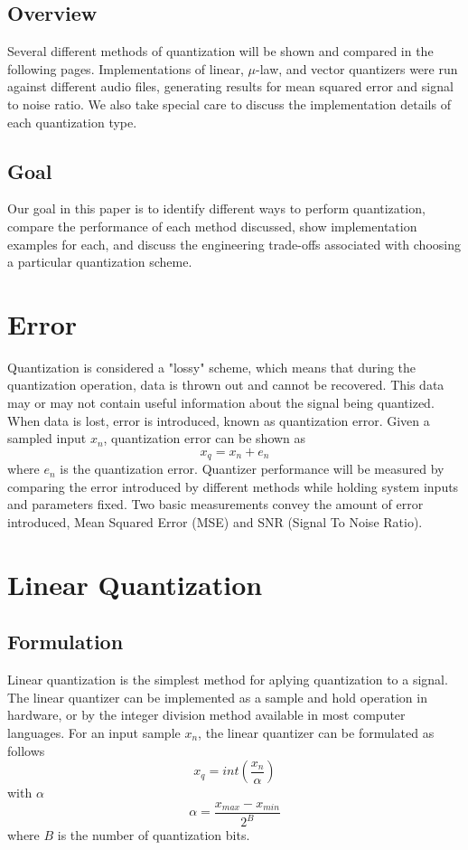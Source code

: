 \documentclass[journal]{IEEEtran}
\begin{document}
\subsection{Overview}
Several different methods of quantization will be shown and compared in the following pages. Implementations of linear, 
$\mu$-law, and vector quantizers were run against different audio files, generating results for mean squared error and 
signal to noise ratio. We also take special care to discuss the implementation details of each quantization type.

\subsection{Goal}
Our goal in this paper is to identify different ways to perform quantization, compare the performance of each method discussed, show 
implementation examples for each, and discuss the engineering trade-offs associated with choosing a particular quantization scheme.

\section{Error}
Quantization is considered a "lossy" scheme, which means that during the quantization operation, data is thrown out and cannot
be recovered. This data may or may not contain useful information about the signal being quantized. When data is lost, error is
introduced, known as quantization error. Given a sampled input $x_n$, quantization error can be shown as \cite{DSPBook}
\begin{equation}
x_q = x_n + e_n
\end{equation}
where $e_n$ is the quantization error. Quantizer performance will be measured by comparing the error introduced by different methods
while holding system inputs and parameters fixed. Two basic measurements convey the amount of error introduced, Mean Squared Error (MSE)
and SNR (Signal To Noise Ratio).

\section{Linear Quantization}
\subsection{Formulation}
Linear quantization is the simplest method for aplying quantization to a signal. The linear quantizer can be implemented as a sample
and hold operation in hardware, or by the integer division method available in most computer languages. For an input sample $x_n$, the
linear quantizer can be formulated as follows \cite{DSPBook}
\begin{equation}
    x_q = int(\frac{x_n}{\alpha}) 
\end{equation}
with $\alpha$
\begin{equation}
    \alpha = \frac{x_{max} - x_{min}}{2^B}
\end{equation}
where $B$ is the number of quantization bits.
\end{document}
